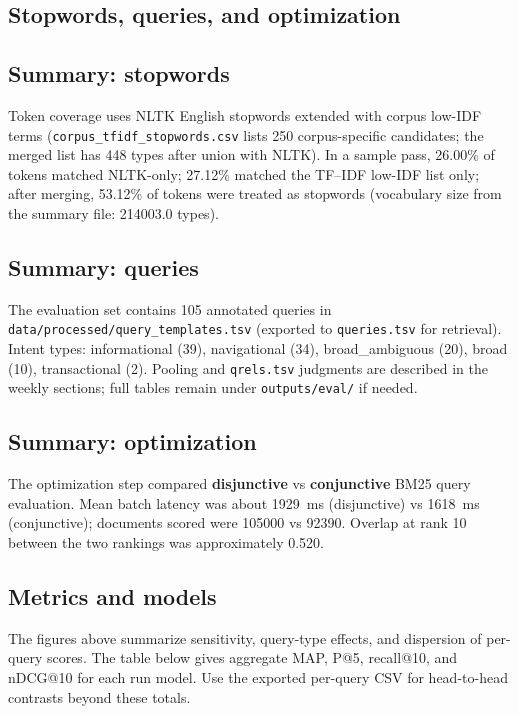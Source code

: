 \subsection{Stopwords, queries, and optimization}
\subsection*{Summary: stopwords}

Token coverage uses NLTK English stopwords extended with corpus low-IDF terms (\texttt{corpus\_tfidf\_stopwords.csv} lists 250 corpus-specific candidates; the merged list has 448 types after union with NLTK). In a sample pass, 26.00\% of tokens matched NLTK-only; 27.12\% matched the TF--IDF low-IDF list only; after merging, 53.12\% of tokens were treated as stopwords (vocabulary size from the summary file: 214003.0 types).

\subsection*{Summary: queries}

The evaluation set contains 105 annotated queries in \texttt{data/processed/query\_templates.tsv} (exported to \texttt{queries.tsv} for retrieval). Intent types: informational (39), navigational (34), broad\_ambiguous (20), broad (10), transactional (2). Pooling and \texttt{qrels.tsv} judgments are described in the weekly sections; full tables remain under \texttt{outputs/eval/} if needed.

\subsection*{Summary: optimization}

The optimization step compared \textbf{disjunctive} vs \textbf{conjunctive} BM25 query evaluation. Mean batch latency was about 1929~ms (disjunctive) vs 1618~ms (conjunctive); documents scored were 105000 vs 92390. Overlap at rank 10 between the two rankings was approximately 0.520.

\subsection*{Metrics and models}

The figures above summarize sensitivity, query-type effects, and dispersion of per-query scores. The table below gives aggregate MAP, P@5, recall@10, and nDCG@10 for each run model. Use the exported per-query CSV for head-to-head contrasts beyond these totals.

